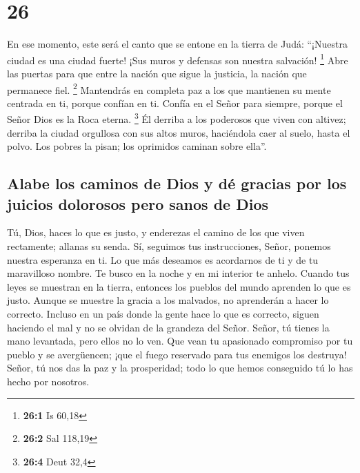 \hypertarget{section-25}{%
\section{26}\label{section-25}}

 En ese momento, este será el canto que se entone en la
tierra de Judá: ``¡Nuestra ciudad es una ciudad fuerte! ¡Sus muros y
defensas son nuestra salvación! \footnote{\textbf{26:1} Is 60,18}
 Abre las puertas para que entre la nación que sigue la
justicia, la nación que permanece fiel. \footnote{\textbf{26:2} Sal
  118,19}  Mantendrás en completa paz a los que mantienen
su mente centrada en ti, porque confían en ti.  Confía en
el Señor para siempre, porque el Señor Dios es la Roca eterna.
\footnote{\textbf{26:4} Deut 32,4}  Él derriba a los
poderosos que viven con altivez; derriba la ciudad orgullosa con sus
altos muros, haciéndola caer al suelo, hasta el polvo. 
Los pobres la pisan; los oprimidos caminan sobre ella''.

\hypertarget{alabe-los-caminos-de-dios-y-duxe9-gracias-por-los-juicios-dolorosos-pero-sanos-de-dios}{%
\subsection{Alabe los caminos de Dios y dé gracias por los juicios
dolorosos pero sanos de
Dios}\label{alabe-los-caminos-de-dios-y-duxe9-gracias-por-los-juicios-dolorosos-pero-sanos-de-dios}}

 Tú, Dios, haces lo que es justo, y enderezas el camino de
los que viven rectamente; allanas su senda.  Sí, seguimos
tus instrucciones, Señor, ponemos nuestra esperanza en ti. Lo que más
deseamos es acordarnos de ti y de tu maravilloso nombre. 
Te busco en la noche y en mi interior te anhelo. Cuando tus leyes se
muestran en la tierra, entonces los pueblos del mundo aprenden lo que es
justo.  Aunque se muestre la gracia a los malvados, no
aprenderán a hacer lo correcto. Incluso en un país donde la gente hace
lo que es correcto, siguen haciendo el mal y no se olvidan de la
grandeza del Señor.  Señor, tú tienes la mano levantada,
pero ellos no lo ven. Que vean tu apasionado compromiso por tu pueblo y
se avergüencen; ¡que el fuego reservado para tus enemigos los destruya!
 Señor, tú nos das la paz y la prosperidad; todo lo que
hemos conseguido tú lo has hecho por nosotros.

